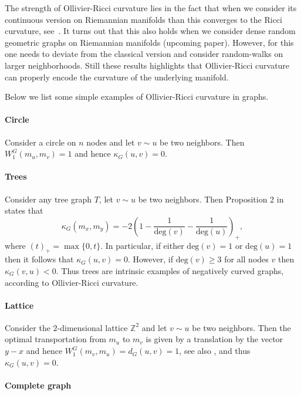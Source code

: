 \documentclass{article}
\begin{document}
The strength of Ollivier-Ricci curvature lies in the fact that when we consider its continuous version on Riemannian manifolds than this converges to the Ricci curvature, see~\cite[Example 7]{ollivier2009ricci}. It turns out that this also holds when we consider dense random geometric graphs on Riemannian manifolds (upcoming paper). However, for this one needs to deviate from the classical version and consider random-walks on larger neighborhoods. Still these results highlights that Ollivier-Ricci curvature can properly encode the curvature of the underlying manifold. 

Below we list some simple examples of Ollivier-Ricci curvature in graphs.

\paragraph{Circle}

Consider a circle on $n$ nodes and let $v \sim u$ be two neighbors. Then $W_1^G(m_u,m_v) = 1$ and hence $\kappa_G(u,v) = 0$.

\paragraph{Trees}

Consider any tree graph $T$, let $v \sim u$ be two neighbors. Then Proposition 2 in \cite{jost2014ollivier} states that
\[
	\kappa_G(m_x,m_y) = -2\left(1 - \frac{1}{\mathrm{deg}(v)} - \frac{1}{\mathrm{deg}(u)}\right)_+, 
\]
where $(t)_+ = \max\{0,t\}$. In particular, if either $\mathrm{deg}(v) = 1$ or $\mathrm{deg}(u) = 1$ then it follows that $\kappa_G(u,v) = 0$. However, if $\mathrm{deg}(v) \ge 3$ for all nodes $v$ then $\kappa_G(v,u) < 0$. Thus trees are intrinsic examples of negatively curved graphs, according to Ollivier-Ricci curvature.

\paragraph{Lattice}
Consider the $2$-dimensional lattice $\mathbb{Z}^2$ and let $v \sim u$ be two neighbors. Then the optimal transportation from $m_u$ to $m_v$ is given by a translation by the vector $y - x$ and hence $W_1^G(m_v,m_u) = d_G(u,v) = 1$, see also \cite[Example 5]{ollivier2009ricci}, and thus $\kappa_G(u,v) = 0$.

\paragraph{Complete graph}
\end{document}
